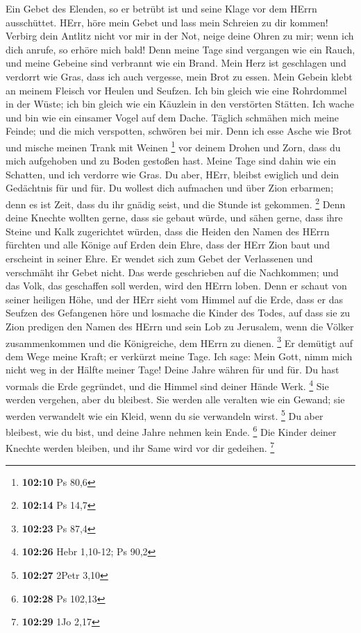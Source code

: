  Ein Gebet des Elenden, so er betrübt ist und seine Klage
vor dem HErrn ausschüttet.  HErr, höre mein Gebet und lass
mein Schreien zu dir kommen!  Verbirg dein Antlitz nicht
vor mir in der Not, neige deine Ohren zu mir; wenn ich dich anrufe, so
erhöre mich bald!  Denn meine Tage sind vergangen wie ein
Rauch, und meine Gebeine sind verbrannt wie ein Brand. 
Mein Herz ist geschlagen und verdorrt wie Gras, dass ich auch vergesse,
mein Brot zu essen.  Mein Gebein klebt an meinem Fleisch
vor Heulen und Seufzen.  Ich bin gleich wie eine
Rohrdommel in der Wüste; ich bin gleich wie ein Käuzlein in den
verstörten Stätten.  Ich wache und bin wie ein einsamer
Vogel auf dem Dache.  Täglich schmähen mich meine Feinde;
und die mich verspotten, schwören bei mir.  Denn ich esse
Asche wie Brot und mische meinen Trank mit Weinen \footnote{\textbf{102:10}
  Ps 80,6}  vor deinem Drohen und Zorn, dass du mich
aufgehoben und zu Boden gestoßen hast.  Meine Tage sind
dahin wie ein Schatten, und ich verdorre wie Gras.  Du
aber, HErr, bleibst ewiglich und dein Gedächtnis für und für.
 Du wollest dich aufmachen und über Zion erbarmen; denn
es ist Zeit, dass du ihr gnädig seist, und die Stunde ist gekommen.
\footnote{\textbf{102:14} Ps 14,7}  Denn deine Knechte
wollten gerne, dass sie gebaut würde, und sähen gerne, dass ihre Steine
und Kalk zugerichtet würden,  dass die Heiden den Namen
des HErrn fürchten und alle Könige auf Erden dein Ehre, 
dass der HErr Zion baut und erscheint in seiner Ehre.  Er
wendet sich zum Gebet der Verlassenen und verschmäht ihr Gebet nicht.
 Das werde geschrieben auf die Nachkommen; und das Volk,
das geschaffen soll werden, wird den HErrn loben.  Denn
er schaut von seiner heiligen Höhe, und der HErr sieht vom Himmel auf
die Erde,  dass er das Seufzen des Gefangenen höre und
losmache die Kinder des Todes,  auf dass sie zu Zion
predigen den Namen des HErrn und sein Lob zu Jerusalem, 
wenn die Völker zusammenkommen und die Königreiche, dem HErrn zu dienen.
\footnote{\textbf{102:23} Ps 87,4}  Er demütigt auf dem
Wege meine Kraft; er verkürzt meine Tage.  Ich sage: Mein
Gott, nimm mich nicht weg in der Hälfte meiner Tage! Deine Jahre währen
für und für.  Du hast vormals die Erde gegründet, und die
Himmel sind deiner Hände Werk. \footnote{\textbf{102:26} Hebr 1,10-12;
  Ps 90,2}  Sie werden vergehen, aber du bleibest. Sie
werden alle veralten wie ein Gewand; sie werden verwandelt wie ein
Kleid, wenn du sie verwandeln wirst. \footnote{\textbf{102:27} 2Petr
  3,10}  Du aber bleibest, wie du bist, und deine Jahre
nehmen kein Ende. \footnote{\textbf{102:28} Ps 102,13} 
Die Kinder deiner Knechte werden bleiben, und ihr Same wird vor dir
gedeihen. \footnote{\textbf{102:29} 1Jo 2,17}

